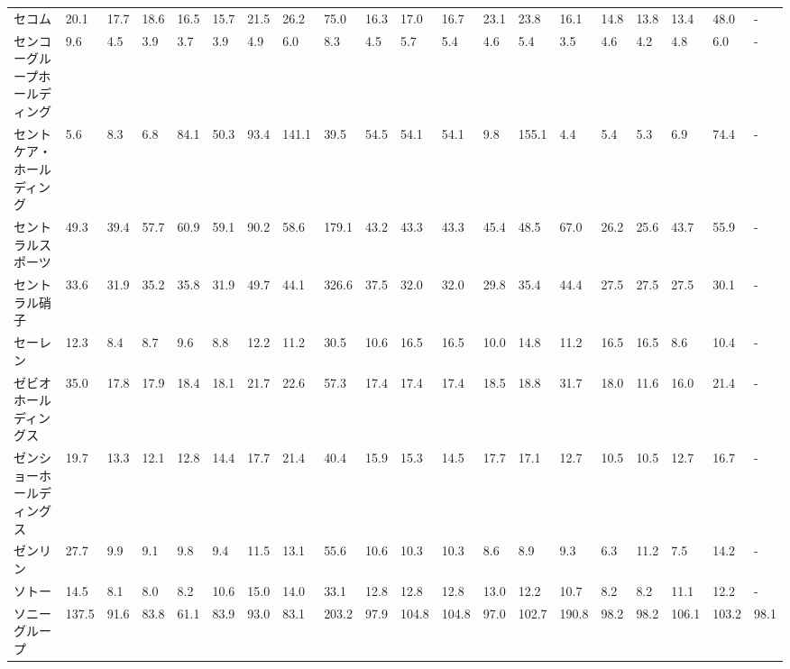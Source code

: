 \begin{longtable}[c]{lp{3mm}p{3mm}p{3mm}p{3mm}p{3mm}p{3mm}p{3mm}p{3mm}p{3mm}p{3mm}p{3mm}p{3mm}p{3mm}p{3mm}p{3mm}p{3mm}p{3mm}p{3mm}p{3mm}}
セコム             &   20.1 &   17.7 &      18.6 &      16.5 &       15.7 &    21.5 &    26.2 &     75.0 &    16.3 &    17.0 &   16.7 &   23.1 &    23.8 &    16.1 &    14.8 &   13.8 &   13.4 &    48.0 &      - \\
センコーグループホールディング &    9.6 &    4.5 &       3.9 &       3.7 &        3.9 &     4.9 &     6.0 &      8.3 &     4.5 &     5.7 &    5.4 &    4.6 &     5.4 &     3.5 &     4.6 &    4.2 &    4.8 &     6.0 &      - \\
セントケア・ホールディング   &    5.6 &    8.3 &       6.8 &      84.1 &       50.3 &    93.4 &   141.1 &     39.5 &    54.5 &    54.1 &   54.1 &    9.8 &   155.1 &     4.4 &     5.4 &    5.3 &    6.9 &    74.4 &      - \\
セントラルスポーツ       &   49.3 &   39.4 &      57.7 &      60.9 &       59.1 &    90.2 &    58.6 &    179.1 &    43.2 &    43.3 &   43.3 &   45.4 &    48.5 &    67.0 &    26.2 &   25.6 &   43.7 &    55.9 &      - \\
セントラル硝子         &   33.6 &   31.9 &      35.2 &      35.8 &       31.9 &    49.7 &    44.1 &    326.6 &    37.5 &    32.0 &   32.0 &   29.8 &    35.4 &    44.4 &    27.5 &   27.5 &   27.5 &    30.1 &      - \\
セーレン            &   12.3 &    8.4 &       8.7 &       9.6 &        8.8 &    12.2 &    11.2 &     30.5 &    10.6 &    16.5 &   16.5 &   10.0 &    14.8 &    11.2 &    16.5 &   16.5 &    8.6 &    10.4 &      - \\
ゼビオホールディングス     &   35.0 &   17.8 &      17.9 &      18.4 &       18.1 &    21.7 &    22.6 &     57.3 &    17.4 &    17.4 &   17.4 &   18.5 &    18.8 &    31.7 &    18.0 &   11.6 &   16.0 &    21.4 &      - \\
ゼンショーホールディングス   &   19.7 &   13.3 &      12.1 &      12.8 &       14.4 &    17.7 &    21.4 &     40.4 &    15.9 &    15.3 &   14.5 &   17.7 &    17.1 &    12.7 &    10.5 &   10.5 &   12.7 &    16.7 &      - \\
ゼンリン            &   27.7 &    9.9 &       9.1 &       9.8 &        9.4 &    11.5 &    13.1 &     55.6 &    10.6 &    10.3 &   10.3 &    8.6 &     8.9 &     9.3 &     6.3 &   11.2 &    7.5 &    14.2 &      - \\
ソトー             &   14.5 &    8.1 &       8.0 &       8.2 &       10.6 &    15.0 &    14.0 &     33.1 &    12.8 &    12.8 &   12.8 &   13.0 &    12.2 &    10.7 &     8.2 &    8.2 &   11.1 &    12.2 &      - \\
ソニーグループ         &  137.5 &   91.6 &      83.8 &      61.1 &       83.9 &    93.0 &    83.1 &    203.2 &    97.9 &   104.8 &  104.8 &   97.0 &   102.7 &   190.8 &    98.2 &   98.2 &  106.1 &   103.2 &   98.1 \\

\end{longtable}
